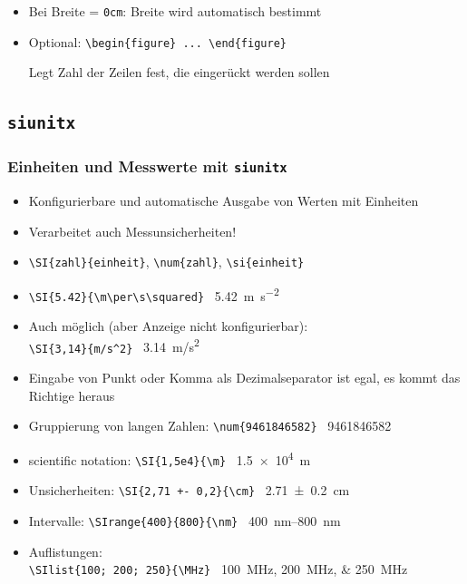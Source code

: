 \begin{frame}[<+->][fragile]
\begin{itemize}
\begin{columns}
		\end{columns}
		\item Bei Breite = \texttt{0cm}: Breite wird automatisch bestimmt
		\item Optional: \lstinline!\begin{figure} ... \end{figure}!
		
		Legt Zahl der Zeilen fest, die eingerückt werden sollen
	\end{itemize}
\end{frame}

\subsection{\texttt{siunitx}}

\begin{frame}[<+->][fragile]
	\frametitle{Einheiten und Messwerte mit \texttt{siunitx}}

	\begin{itemize}
		\item Konfigurierbare und automatische Ausgabe von Werten mit Einheiten
		\item Verarbeitet auch Messunsicherheiten!
		\item \lstinline!\SI{zahl}{einheit}!, \lstinline!\num{zahl}!, \lstinline!\si{einheit}!
		\item \lstinline!\SI{5.42}{\m\per\s\squared}!
		\textrightarrow~{\rmfamily\SI{5.42}{\m\per\s\squared}}
		\DeactivateWarningFilters
		\item Auch möglich (aber Anzeige nicht konfigurierbar):\\
		\lstinline!\SI{3,14}{m/s^2}!
		\textrightarrow~{\rmfamily\SI{3,14}{m/s^2}}
		\item Eingabe von Punkt oder Komma als Dezimalseparator ist egal, es kommt das Richtige heraus
		\item Gruppierung von langen Zahlen: \lstinline!\num{9461846582}! \textrightarrow~{\rmfamily\num{9461846582}}
		\item scientific notation: \lstinline!\SI{1,5e4}{\m}!
		\textrightarrow~{\rmfamily\SI{1,5e4}{\m}}
		\item Unsicherheiten: \lstinline!\SI{2,71 +- 0,2}{\cm}!
		\textrightarrow~{\rmfamily\SI{2,71 +- 0,2}{\cm}}
		\item Intervalle: \lstinline!\SIrange{400}{800}{\nm}!
		\textrightarrow~{\rmfamily\SIrange{400}{800}{\nm}}
		\item Auflistungen:\\
		\lstinline!\SIlist{100; 200; 250}{\MHz}!
		\textrightarrow~{\rmfamily\SIlist{100; 200; 250}{\MHz}}
	\end{itemize}
\end{frame}

